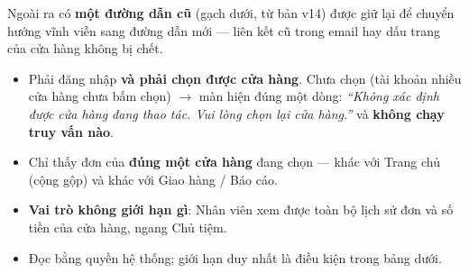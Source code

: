 Ngoài ra có \textbf{một đường dẫn cũ}  (gạch dưới, từ bản v14) được
giữ lại để chuyển hướng vĩnh viễn sang đường dẫn mới --- liên kết cũ trong email hay dấu trang
của cửa hàng không bị chết.

\mai

\begin{itemize}[leftmargin=*]
  \item Phải đăng nhập \textbf{và phải chọn được cửa hàng}. Chưa chọn (tài khoản nhiều cửa hàng
        chưa bấm chọn) $\rightarrow$ màn hiện đúng một dòng:
        \emph{``Không xác định được cửa hàng đang thao tác. Vui lòng chọn lại cửa hàng.''} và
        \textbf{không chạy truy vấn nào}.
  \item Chỉ thấy đơn của \textbf{đúng một cửa hàng} đang chọn --- khác với Trang chủ (cộng gộp)
        và khác với Giao hàng / Báo cáo.
  \item \textbf{Vai trò không giới hạn gì}: Nhân viên xem được toàn bộ lịch sử đơn và số tiền
        của cửa hàng, ngang Chủ tiệm.
  \item Đọc bằng quyền hệ thống; giới hạn duy nhất là điều kiện  trong bảng
        dưới.
\end{itemize}

\mhien

